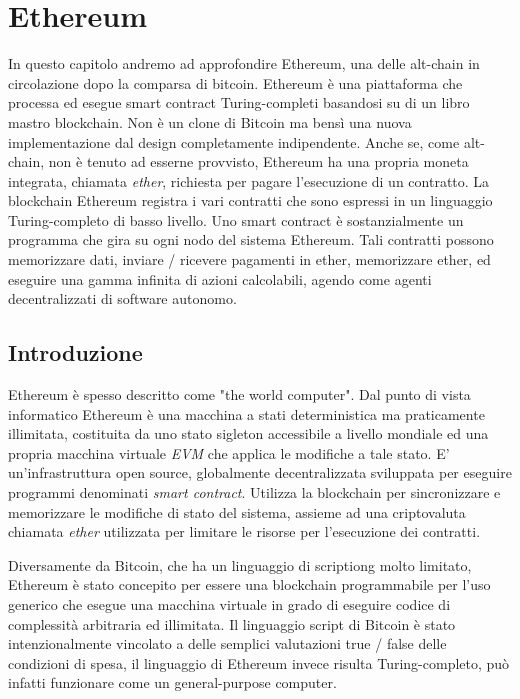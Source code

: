 
\chapter{Ethereum}
\label{bitcoin-chapter}
In questo capitolo andremo ad approfondire Ethereum, una delle alt-chain in circolazione dopo la comparsa di bitcoin. Ethereum è una piattaforma che processa ed esegue smart contract Turing-completi basandosi su di un libro mastro blockchain. Non è un clone di Bitcoin ma bensì una nuova implementazione dal design completamente indipendente. Anche se, come alt-chain, non è tenuto ad esserne provvisto, Ethereum ha una propria moneta integrata, chiamata \textit{ether}, richiesta per pagare l'esecuzione di un contratto. La blockchain Ethereum registra i vari contratti che sono espressi in un linguaggio Turing-completo di basso livello. Uno smart contract è sostanzialmente un programma che gira su ogni nodo del sistema Ethereum. Tali contratti possono memorizzare dati, inviare / ricevere pagamenti in ether, memorizzare ether, ed eseguire una gamma infinita di azioni calcolabili, agendo come agenti decentralizzati di software autonomo.

\section{Introduzione}
Ethereum è spesso descritto come "the world computer". Dal punto di vista informatico Ethereum è una macchina a stati deterministica ma praticamente illimitata, costituita da uno stato sigleton accessibile a livello mondiale ed una propria macchina virtuale \textit{EVM} che applica le modifiche a tale stato. E' un'infrastruttura open source, globalmente decentralizzata sviluppata per eseguire programmi denominati \textit{smart contract}. Utilizza la blockchain per sincronizzare e memorizzare le modifiche di stato del sistema, assieme ad una criptovaluta chiamata \textit{ether} utilizzata per limitare le risorse per l'esecuzione dei contratti. 

Diversamente da Bitcoin, che ha un linguaggio di scriptiong molto limitato, Ethereum è stato concepito per essere una blockchain programmabile per l'uso generico che esegue una macchina virtuale in grado di eseguire codice di complessità arbitraria ed illimitata. Il linguaggio script di Bitcoin è stato intenzionalmente vincolato a delle semplici valutazioni true / false delle condizioni di spesa, il linguaggio di Ethereum invece risulta Turing-completo, può infatti funzionare come un general-purpose computer.

